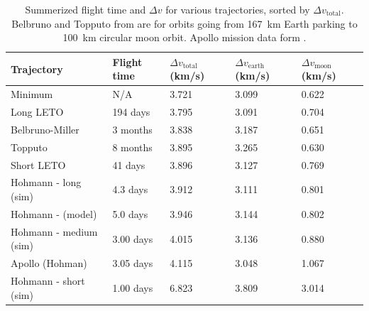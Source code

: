 \begin{table}
    \begin{tabular}{|l|l|l|l|l|}
    \hline
    Trajectory                    & Flight time             & $\Delta v_{\text{total}}$ (\scriptsize{km/s)} & $\Delta v_{\text{earth}}$ (\scriptsize{km/s)} & $\Delta v_{\text{moon}}$ (\scriptsize{km/s)} \\ \hline
    Minimum                       & N/A                     & 3.721                     & 3.099                     & 0.622                    \\ \hline
    Long LETO                     & 194 days  & 3.795                     & 3.091                     & 0.704                    \\ \hline
    Belbruno-Miller               & 3 months                & 3.838                     & 3.187                     & 0.651                    \\ \hline
    Topputo                       & 8 months                & 3.895                     & 3.265                     & 0.630                    \\ \hline
    Short LETO                    & 41 days                 & 3.896                     & 3.127                     & 0.769                    \\ \hline
    Hohmann - long (sim)   & 4.3 days                & 3.912                     & 3.111                     & 0.801                    \\ \hline
    Hohmann - (model)      & 5.0 days                & 3.946                     & 3.144                     & 0.802                    \\ \hline
    Hohmann - medium (sim) & 3.00 days               & 4.015                     & 3.136                     & 0.880                    \\ \hline
    Apollo (Hohman)      & 3.05 days               & 4.115                     & 3.048                     & 1.067                    \\ \hline
    Hohmann - short (sim)  & 1.00 days               & 6.823                     & 3.809                     & 3.014                    \\ \hline
\end{tabular}
\caption{Summerized flight time and $\Delta v$ for various trajectories, sorted by $\Delta v_{\text{total}}$. Belbruno and Topputo from \cite{Juul2008} are for orbits going from \SI{167}{\km} Earth parking to \SI{100}{\km} circular moon orbit. Apollo mission data form \cite{NASA1966} \cite{apollo-timeline}.}
\label{tab:results}
\end{table}

